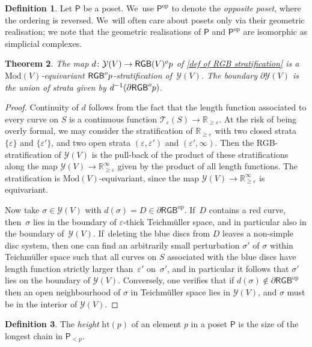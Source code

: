 \documentclass[11pt]{article}
\theoremstyle{plain}
\newtheorem{thm}{Theorem}[section]
\theoremstyle{definition}
\newtheorem{defn}[thm]{Definition}
\let\eps\varepsilon
\newcommand{\R}{\mathbb R}
\newcommand{\T}{\mathcal T}
\newcommand{\Y}{\mathcal Y}
\newcommand{\RGB}{{\mathsf{RGB}}}
\newcommand{\dRGB}{\partial\mathsf{RGB}}
\newcommand{\Po}{\mathsf{P}}
\newcommand{\hmod}{\mathrm{Mod}}
\newcommand{\op}{{\mathrm{op}}}
\newcommand{\Ht}{{\mathrm{ht}}}
\begin{document}
\begin{defn}Let $\Po$ be a poset. We~use $\Po^\op$ to denote the \emph{opposite poset}, where the ordering is reversed. We~will often care about posets only via their geometric realisation; we note that the geometric realisations of $\Po$ and $\Po^\op$ are isomorphic as simplicial complexes.
\end{defn}

\begin{thm}\label{thm:combinatorial model}
The map $d \colon \Y(V) \to \RGB(V)^\textnormal{op}$ of \cref{def of RGB stratification} is a $\hmod(V)$-equivariant $\RGB^\textnormal{op}$-stratification of $\,\Y(V)$. The boundary $\partial \Y(V)$ is the union of strata given by $d^{-1}(\dRGB^\textnormal{op})$.
\end{thm}

\begin{proof}Continuity of $d$ follows from the fact that the length function associated to every curve on $S$ is a continuous function $\T_\eps(S)\to \R_{\geq \eps}$. At the risk of being overly formal, we may consider the stratification of $\R_{\geq \eps}$ with two closed strata $\{\eps\}$ and $\{\eps'\}$, and two open strata $(\eps,\eps')$ and $(\eps',\infty)$. Then the RGB-stratification of $\Y(V)$ is the pull-back of the product of these stratifications along the map $\Y(V) \to \R_{\geq \eps}^\infty$ given by the product of all length functions. The stratification is $\hmod(V)$-equivariant, since the map $\Y(V) \to \R_{\geq \eps}^\infty$ is equivariant.

Now take $\sigma \in \Y(V)$ with $d(\sigma)=D\in \dRGB^\op$. If~$D$ contains a red curve, then~$\sigma$ lies in the boundary of $\eps$-thick Teichmüller space, and in particular also in the boundary of~$\Y(V)$. If~deleting the blue discs from $D$ leaves a non-simple disc system, then one can find an arbitrarily small perturbation $\sigma'$ of $\sigma$ within Teichmüller space such that all curves on $S$ associated with the blue discs have length function strictly larger than~$\eps'$ on~$\sigma'$, and in particular it follows that $\sigma'$ lies on the boundary of $\Y(V)$. Conversely, one verifies that if $d(\sigma) \notin \dRGB^\op$ then an open neighbourhood of $\sigma$ in Teichmüller space lies in $\Y(V)$, and $\sigma$ must be in the interior of $\Y(V)$.
\end{proof}

\begin{defn}\label{ht of element}
The \emph{height} $\Ht(p)$ of an element $p$ in a poset $\Po$ is the size of the longest chain in $\Po_{<p}$.
\end{defn}
\end{document}
